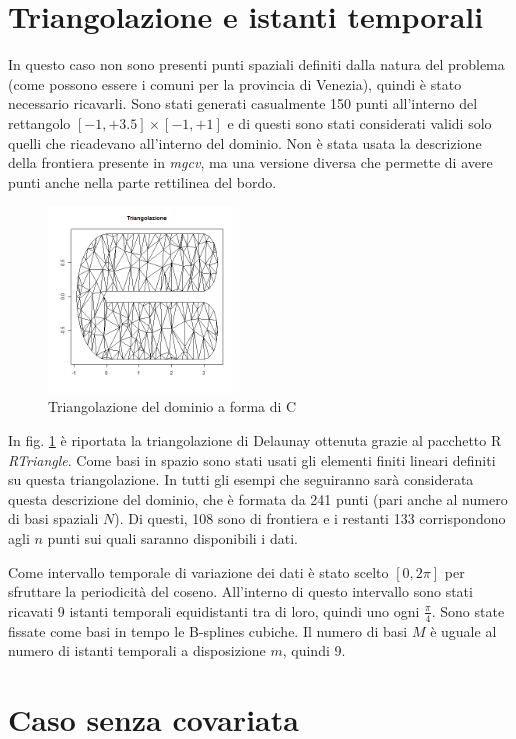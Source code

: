 \documentclass[a4paper,11pt,twoside,openright]{book}							%
\begin{document}
\section{Triangolazione e istanti temporali}
In questo caso non sono presenti punti spaziali definiti dalla natura del problema (come possono essere i comuni per la provincia di Venezia), quindi è stato necessario ricavarli. Sono stati generati casualmente 150 punti all'interno del rettangolo $[-1,+3.5] \times [-1,+1]$ e di questi sono stati considerati validi solo quelli che ricadevano all'interno del dominio. Non è stata usata la descrizione della frontiera presente in \textit{mgcv}, ma una versione diversa che permette di avere punti anche nella parte rettilinea del bordo.
\begin{figure}[t]
	\centering
	\includegraphics[width=0.44\textwidth]{Immagini/DomCinizio/DomC_Triangolazione.png}
	\caption{Triangolazione del dominio a forma di C}
	\label{fig:domC_triang}
\end{figure}
In fig. \ref{fig:domC_triang} è riportata la triangolazione di Delaunay ottenuta grazie al pacchetto R \textit{RTriangle}. Come basi in spazio sono stati usati gli elementi finiti lineari definiti su questa triangolazione. In tutti gli esempi che seguiranno sarà considerata questa descrizione del dominio, che è formata da 241 punti (pari anche al numero di basi spaziali $N$). Di questi, 108 sono di frontiera e i restanti 133 corrispondono agli $n$ punti sui quali saranno disponibili i dati.

Come intervallo temporale di variazione dei dati è stato scelto $[0,2\pi]$ per sfruttare la periodicità del coseno. All'interno di questo intervallo sono stati ricavati 9 istanti temporali equidistanti tra di loro, quindi uno ogni $\frac{\pi}{4}$. Sono state fissate come basi in tempo le B-splines cubiche. Il numero di basi $M$ è uguale al numero di istanti temporali a disposizione $m$, quindi 9. 
\newpage
\section{Caso senza covariata}
\end{document}
